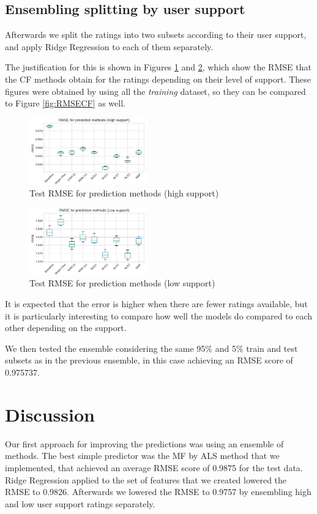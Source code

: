 \documentclass[10pt,conference,compsocconf]{IEEEtran}
\begin{document}
  \subsection{Ensembling splitting by user support} %
  \label{sub:ensembling_considering_user_support}
    Afterwards we split the ratings into two subsets according to their user support, and apply Ridge Regression to each of them separately.

    The justification for this is shown in Figures \ref{fig:RMSECFH} and \ref{fig:RMSECFL}, which show the RMSE that the CF methods obtain for the ratings depending on their level of support. These figures were obtained by using all the \emph{training} dataset, so they can be compared to Figure \ref{fig:RMSECF} as well.
    \begin{figure}[htp]
      \centering
      \includegraphics[width=0.45\textwidth]{RMSECFH}
      \caption{Test RMSE for prediction methods (high support)}
      \label{fig:RMSECFH}
    \end{figure}
    \begin{figure}[htp]
      \centering
      \includegraphics[width=0.45\textwidth]{RMSECFL}
      \caption{Test RMSE for prediction methods (low support)}
      \label{fig:RMSECFL}
    \end{figure}
    It is expected that the error is higher when there are fewer ratings available, but it is particularly interesting to compare how well the models do compared to each other depending on the support.

    We then tested the ensemble considering the same 95\% and 5\% train and test subsets as in the previous ensemble, in this case achieving an RMSE score of 0.975737.
\section{Discussion}
\label{sec:discussion}
  Our first approach for improving the predictions was using an ensemble of methods. The best simple predictor was the MF by ALS method that we implemented, that achieved an average RMSE score of 0.9875 for the test data. Ridge Regression applied to the set of features that we created lowered the RMSE to 0.9826.
  Afterwards we lowered the RMSE to 0.9757 by ensembling high and low user support ratings separately.
\end{document}
